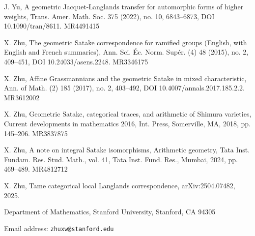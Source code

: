 \begin{refs}
\item[{[83]}] J. Yu, A geometric Jacquet-Langlands transfer for automorphic forms of higher weights, Trans. Amer. Math. Soc. 375 (2022), no. 10, 6843--6873, DOI 10.1090/tran/8611. MR4491415
\item[{[84]}] X. Zhu, The geometric Satake correspondence for ramified groups (English, with English and French summaries), Ann. Sci. \'Ec. Norm. Sup\'er. (4) 48 (2015), no. 2, 409--451, DOI 10.24033/asens.2248. MR3346175
\item[{[85]}] X. Zhu, Affine Grassmannians and the geometric Satake in mixed characteristic, Ann. of Math. (2) 185 (2017), no. 2, 403--492, DOI 10.4007/annals.2017.185.2.2. MR3612002
\item[{[86]}] X. Zhu, Geometric Satake, categorical traces, and arithmetic of Shimura varieties, Current developments in mathematics 2016, Int. Press, Somerville, MA, 2018, pp. 145--206. MR3837875
\item[{[87]}] X. Zhu, A note on integral Satake isomorphisms, Arithmetic geometry, Tata Inst. Fundam. Res. Stud. Math., vol. 41, Tata Inst. Fund. Res., Mumbai, 2024, pp. 469--489. MR4812712
\item[{[88]}] X. Zhu, Tame categorical local Langlands correspondence, arXiv:2504.07482, 2025.
\end{refs}

\medskip
\noindent Department of Mathematics, Stanford University, Stanford, CA 94305

\noindent Email address: \texttt{zhuxw@stanford.edu}
